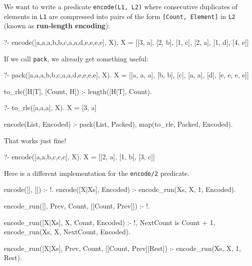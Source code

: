 We want to write a predicate \texttt{encode(L1, L2)} where consecutive duplicates of elements in \texttt{L1} are compressed into pairs of the form \texttt{[Count, Element]} in \texttt{L2} (known as \textbf{run-length encoding}):

\begin{codeblock}
?- encode([a,a,a,b,b,c,a,a,d,e,e,e,e], X).
X = [[3, a], [2, b], [1, c], [2, a], [1, d], [4, e]]
\end{codeblock}


If we call \texttt{pack}, we already get something useful:

\begin{codeblock}
?- pack([a,a,a,b,b,c,a,a,d,e,e,e,e], X).
X = [[a, a, a], [b, b], [c], [a, a], [d], [e, e, e, e]]
\end{codeblock}



\begin{codeblock}
to_rle([H|T], [Count, H]) :-
    length([H|T], Count).
\end{codeblock}

\begin{codeblock}
?- to_rle([a,a,a], X).
X = [3, a]
\end{codeblock}



\begin{codeblock}
encode(List, Encoded) :-
    pack(List, Packed),
    map(to_rle, Packed, Encoded).
\end{codeblock}

That works just fine!

\begin{codeblock}
?- encode([a,a,b,c,c,c], X).
X = [[2, a], [1, b], [3, c]]
\end{codeblock}

\begin{excursion}{}
Here is a different implementation for the \texttt{encode/2} predicate.

\begin{codeblock}
encode([], []) :- !.
encode([X|Xs], Encoded) :-
    encode_run(Xs, X, 1, Encoded).

encode_run([], Prev, Count, [[Count, Prev]]) :- !.

encode_run([X|Xs], X, Count, Encoded) :- !,
    NextCount is Count + 1,
    encode_run(Xs, X, NextCount, Encoded).

encode_run([X|Xs], Prev, Count, [[Count, Prev]|Rest]) :-
    encode_run(Xs, X, 1, Rest).
\end{codeblock}
\end{excursion}
